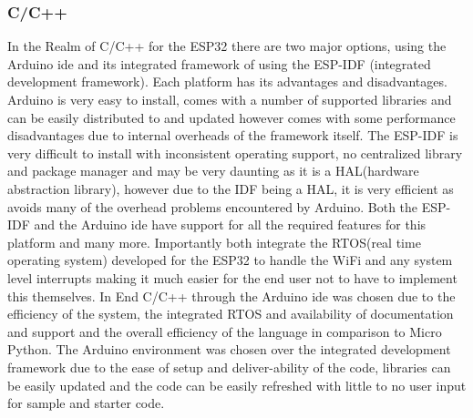 \documentclass[12pt]{report}
\begin{document}
\subsubsection{C/C++}
    In the Realm of C/C++ for the ESP32 there are two major options, using the Arduino ide and its integrated framework of using the ESP-IDF (integrated development framework). Each platform has its advantages and disadvantages. Arduino is very easy to install, comes with a number of supported libraries and can be easily distributed to and updated however comes with some performance disadvantages due to internal overheads of the framework itself. The ESP-IDF is very difficult to install with inconsistent operating support, no centralized library and package manager and may be very daunting as it is a HAL(hardware abstraction library), however due to the IDF being a HAL, it is very efficient as avoids many of the overhead problems encountered by Arduino.
    Both the ESP-IDF and the Arduino ide have support for all the required features for this platform and many more. Importantly both integrate the RTOS(real time operating system) developed for the ESP32 to handle the WiFi and any system level interrupts making it much easier for the end user not to have to implement this themselves. \newline\newline
In End C/C++ through the Arduino ide was chosen due to the efficiency of the system, the integrated RTOS and availability of documentation and support and the overall efficiency of the language in comparison to Micro Python. The Arduino environment was chosen over the integrated development framework due to the ease of setup and deliver-ability of the code, libraries can be easily updated and the code can be easily refreshed with little to no user input for sample and starter code.
\end{document}
